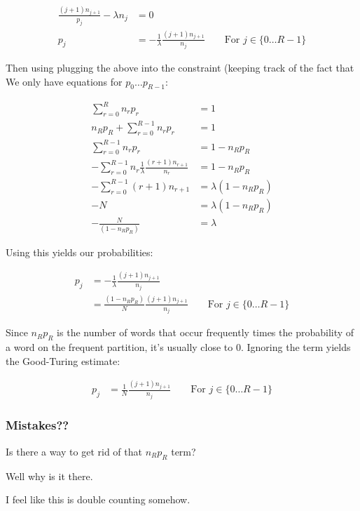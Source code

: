 \documentclass{article}
\begin{document}
			\begin{align}
				\frac{(j+1)n_{j+1}}{p_j} - \lambda n_j &= 0\\
				p_j  &= -\frac{1}{\lambda}\frac{(j+1)n_{j+1}}{n_j}\qquad \text{For }j\in\{0\ldots R-1\}
			\end{align}
			
			Then using plugging the above into the constraint (keeping track of the fact that We only have equations for $p_0\ldots p_{R-1}$:
			
			\begin{align}
				\sum^R_{r=0} n_r p_r &= 1\\
				n_Rp_R + \sum^{R-1}_{r=0} n_r p_r &= 1\\
				\sum^{R-1}_{r=0} n_r p_r &= 1-n_R p_R\\
				-\sum^{R-1}_{r=0} n_r \frac{1}{\lambda}\frac{(r+1)n_{r+1}}{n_r} &= 1-n_R p_R\\
				-\sum^{R-1}_{r=0} (r+1)n_{r+1} &= \lambda(1-n_R p_R)\\
				-N &= \lambda(1-n_R p_R)\\	
				-\frac{N}{(1-n_R p_R)} &= \lambda		
			\end{align}
			
			Using this yields our probabilities:
			
			\begin{align}
				p_j  &= -\frac{1}{\lambda}\frac{(j+1)n_{j+1}}{n_j}\\
				&= \frac{(1-n_R p_R)}{N}\frac{(j+1)n_{j+1}}{n_j} \qquad \text{For }j\in\{0\ldots R-1\}
			\end{align}
			
			Since $n_Rp_R$ is the number of words that occur frequently times the probability of a word on the frequent partition, it's usually close to 0. Ignoring the term yields the Good-Turing estimate:
			
			\begin{align}
				p_j  &= \frac{1}{N}\frac{(j+1)n_{j+1}}{n_j} \qquad \text{For }j\in\{0\ldots R-1\}
			\end{align}
		
		\subsubsection{Mistakes??}
		
			Is there a way to get rid of that $n_Rp_R$ term?
			
			Well why is it there.
			
			I feel like this is double counting somehow. 
			
\end{document}
